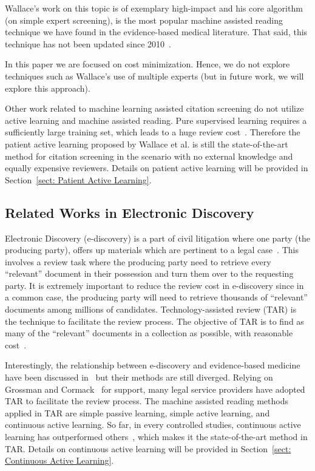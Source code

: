 \documentclass[final,twocolumn,5p]{elsarticle}
\theoremstyle{break}
\begin{document}
Wallace's work on this topic is of  
exemplary high-impact and
 his core algorithm   (on simple expert screening),   is   the most
popular machine assisted reading technique we have found in the
evidence-based medical literature. That said,
this technique has not been updated   since 2010~\cite{wallace2010semi}.

In this paper we are focused on cost minimization. Hence, we do not explore
techniques such as Wallace's use of multiple experts (but in future work,
we will explore this approach).

Other work related to machine learning assisted citation screening do not
utilize active learning and machine assisted reading. Pure supervised learning
requires a sufficiently large training set, which leads to a huge review
cost~\cite{cohen2006reducing, adeva2014automatic}. Therefore the patient active
learning proposed by Wallace et al. is still the state-of-the-art method for
citation screening in the scenario with no external knowledge and equally
expensive reviewers. Details on patient active learning will be provided in Section~\ref{sect: Patient Active Learning}.



\subsection{Related Works in Electronic Discovery}
\label{sect: Electronic Discovery}

Electronic Discovery (e-discovery) is a part of civil litigation where one party (the producing party), offers up materials which are pertinent to a legal case~\cite{krishna2016bigse}. This involves a review task where the producing party need to retrieve every ``relevant'' document in their possession and turn them over to the requesting party. It is extremely important to reduce the review cost in e-discovery since in a common case, the producing party will need to retrieve thousands   of ``relevant'' documents among millions of candidates. Technology-assisted review (TAR) is the technique to facilitate the review process. The objective of TAR is to find as many
of the ``relevant'' documents in a collection as possible, with reasonable cost~\cite{grossman2013}. 

Interestingly, the relationship between e-discovery and evidence-based medicine have been discussed in~\cite{leasesystematic} but their methods are still diverged. Relying on Grossman and Cormack~\cite{grossman2013} for support, many legal service providers have adopted TAR to facilitate the review process.
The machine assisted reading methods applied in TAR are simple passive learning, simple active learning, and continuous active learning. So far, in every controlled studies, continuous active learning has outperformed others~\cite{cormack2014evaluation,cormack2015autonomy}, which makes it the state-of-the-art method in TAR. Details on continuous active learning will be provided in Section~\ref{sect: Continuous Active Learning}.
\end{document}
